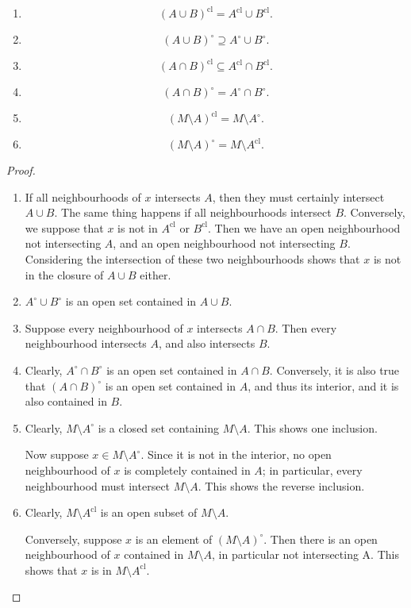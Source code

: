 \documentclass[twoside,symmetric, openany, 12pt]{./tuftebook}
\theoremstyle{definition}
\theoremstyle{definition}
\theoremstyle{definition}
\newenvironment{parts}{\begin{enumerate}[label=(\alph*)]}{\end{enumerate}}
\begin{document}
	\begin{Theorem}
		\noindent
		\begin{parts}
			\item
			\[(A\cup B)^\text{cl}=A^\text{cl}\cup B^\text{cl}.\]
			\item 
			\[
			(A\cup B)^{\circ}\supseteq A^\circ \cup B^\circ
			.\] 
			\item \[
			(A\cap B)^\text{cl}\subseteq A^\text{cl}\cap B^\text{cl}
			.\]
			\item 	\[
			(A\cap B)^\circ = A^\circ \cap B^\circ
			.\] 
			\item \[
			(M\setminus A)^\text{cl}=M\setminus A^{\circ}
			.\]
			\item \[
			(M\setminus A)^\circ = M \setminus A^\text{cl}
			.\] 
		\end{parts}
	\end{Theorem}
\begin{proof}
	\begin{parts}
		\item If all neighbourhoods of $x$ intersects $A$, then they must certainly intersect $A\cup B$. The same thing happens if all neighbourhoods intersect $B$. Conversely, we suppose that $x$ is not in $A^\text{cl}$ or $B^\text{cl}$. Then we have an open neighbourhood not intersecting $A$, and an open neighbourhood not intersecting $B$. Considering the intersection of these two neighbourhoods shows that $x$ is not in the closure of $A\cup B$ either.
		\item $A^\circ\cup B^\circ$ is an open set contained in $A\cup B$.
		\item Suppose every neighbourhood of $x$ intersects $A\cap B$. Then every neighbourhood intersects $A$, and also intersects $B$.
		\item Clearly, $A^\circ \cap B^\circ$ is an open set contained in $A\cap B$. Conversely, it is also true that $(A\cap B)^\circ$ is an open set contained in $A$, and thus its interior, and it is also contained in $B$.
		\item Clearly, $M \setminus A^\circ$ is a closed set containing $M\setminus A$. This shows one inclusion.
		
		Now suppose $x\in M \setminus A^\circ$. Since it is not in the interior, no open neighbourhood of $x$ is completely contained in $A$; in particular, every neighbourhood must intersect $M\setminus A$. This shows the reverse inclusion.
		\item Clearly, $M\setminus A^\text{cl}$ is an open subset of $M \setminus A$.
		
		Conversely, suppose $x$ is an element of $(M \setminus A)^\circ$. Then there is an open neighbourhood of $x$ contained in $M \setminus A$, in particular not intersecting A. This shows that $x$ is in $M \setminus A^\text{cl}$.\qedhere
	\end{parts}
\end{proof}
\end{document}
